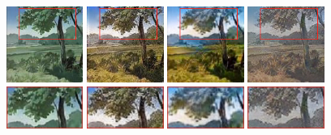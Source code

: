 \documentclass[runningheads]{llncs}
\begin{document}
\begin{figure}[!htb]
\subfigure
{\includegraphics[width=25mm]{zooming_picture/in_ex.jpg}}
\subfigure
{\includegraphics[width=25mm]{zooming_picture/our_ex.jpg}}
\subfigure
{\includegraphics[width=25mm]{zooming_picture/unit_ex.jpg}}
\subfigure
{\includegraphics[width=25mm]{zooming_picture/sgan_ex.jpg}}
\subfigure
{\includegraphics[width=25mm]{zooming_picture/in_ey.jpg}}
\subfigure
{\includegraphics[width=25mm]{zooming_picture/our_ey.jpg}}
\subfigure
{\includegraphics[width=25mm]{zooming_picture/unit_ey.jpg}}
\subfigure
{\includegraphics[width=25mm]{zooming_picture/sgan_ey.jpg}}\\
\hspace{0.08in}

\end{figure}
\end{document}
